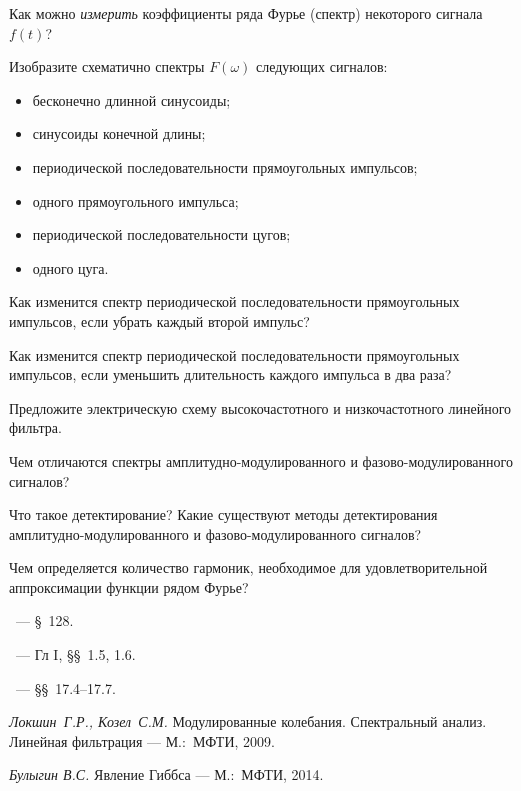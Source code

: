 \begin{lab:questions}
\item Как можно \emph{измерить} коэффициенты ряда Фурье (спектр) некоторого сигнала
$f(t)$?

\item Изобразите схематично спектры $F(\omega)$ следующих сигналов:
\begin{itemize}
    \item бесконечно длинной синусоиды;
    \item синусоиды конечной длины;
    \item периодической последовательности прямоугольных импульсов;
    \item одного прямоугольного импульса;
    \item периодической последовательности цугов;
    \item одного цуга.
\end{itemize}

\item Как изменится спектр периодической последовательности
прямоугольных импульсов, если убрать каждый второй импульс?

\item Как изменится спектр периодической последовательности прямоугольных
импульсов, если уменьшить длительность каждого импульса в два раза?

\item Предложите электрическую схему высокочастотного и 
низкочастотного линейного фильтра.

\item Чем отличаются спектры амплитудно-модулированного 
и фазово-модулированного сигналов?

\item Что такое детектирование? Какие существуют методы детектирования
амплитудно-модулированного и фазово-модулированного сигналов?

\item Чем определяется количество гармоник, необходимое для удовлетворительной 
аппроксимации функции рядом Фурье?
\end{lab:questions}


\begin{lab:literature}
    \item \SivuhinIII~--- \S~128.
    \item \KingLokOlh~--- Гл I, \S\S~1.5, 1.6.
    \item \Kirichenko~--- \S\S~17.4--17.7.
    \item \textit{Локшин~Г.Р., Козел~С.М.} Модулированные колебания. Спектральный
анализ. Линейная фильтрация --- М.:~МФТИ, 2009.
\item \textit{Булыгин В.С.} Явление Гиббса --- М.:~МФТИ, 2014.
\end{lab:literature}




